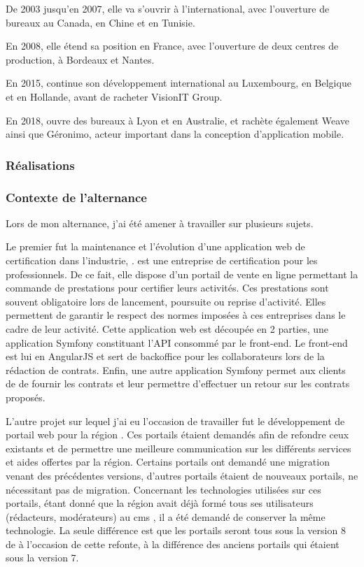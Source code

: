 De 2003 jusqu'en 2007, elle va s'ouvrir à l'international, avec l'ouverture de bureaux au Canada, en Chine et en Tunisie.

En 2008, elle étend sa position en France, avec l'ouverture de deux centres de production, à Bordeaux et Nantes.

En 2015, \onepoint{} continue son développement international au Luxembourg, en Belgique et en Hollande, avant de racheter VisionIT Group.

En 2018, \onepoint{} ouvre des bureaux à Lyon et en Australie, et rachète également Weave ainsi que Géronimo, acteur important dans la conception d'application mobile.

\subsubsection{Réalisations}


\subsubsection{Contexte de l'alternance}

Lors de mon alternance, j'ai été amener à travailler sur plusieurs sujets.

Le premier fut la maintenance et l'évolution d'une application web de certification dans l'industrie, \bv. \bv{} est une entreprise de certification pour les professionnels. De ce fait, elle dispose d’un portail de vente en ligne permettant la commande de prestations pour certifier leurs activités. Ces prestations sont souvent obligatoire lors de lancement, poursuite ou reprise d'activité. Elles permettent de garantir le respect des normes imposées à ces entreprises dans le cadre de leur activité. Cette application web est découpée en 2 parties, une application Symfony constituant l'API consommé par le front-end. Le front-end est lui en AngularJS et sert de backoffice pour les collaborateurs \bv{} lors de la rédaction de contrats. Enfin, une autre application Symfony permet aux clients de \bv{} de fournir les contrats et leur permettre d'effectuer un retour sur les contrats proposés.

L'autre projet sur lequel j'ai eu l'occasion de travailler fut le développement de portail web pour la région \naq{}. Ces portails étaient demandés afin de refondre ceux existants et de permettre une meilleure communication sur les différents services et aides offertes par la région. Certains portails ont demandé une migration venant des précédentes versions, d'autres portails étaient de nouveaux portails, ne nécessitant pas de migration. Concernant les technologies utilisées sur ces portails, étant donné que la région avait déjà formé tous ses utilisateurs (rédacteurs, modérateurs) au \gls{cms} \drupal, il a été demandé de conserver la même technologie. La seule différence est que les portails seront tous sous la version 8 de \drupal{} à l'occasion de cette refonte, à la différence des anciens portails qui étaient sous la version 7.

